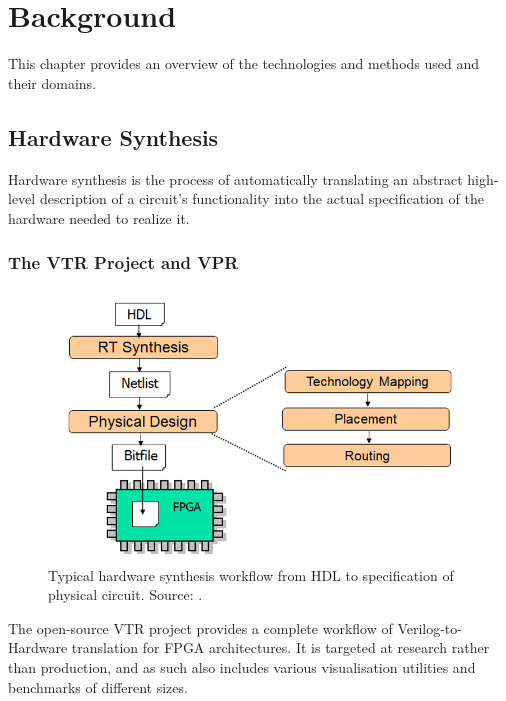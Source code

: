 
\chapter{Background}\label{ch:relatedwork}
\glsresetall %

This chapter provides an overview of the technologies and methods used and their domains.

\section{Hardware Synthesis}

Hardware synthesis is the process of automatically translating an abstract high-level description of a circuit's functionality into the actual specification of the hardware needed to realize it.

\subsection{The VTR Project and VPR}

\begin{figure}
	\includegraphics[width=\linewidth]{plots/hardware-synthesis.png}
	\caption{Typical hardware synthesis workflow from \gls{HDL} to specification of physical circuit. Source: \cite{hardware-synthesis-plot}.}
	\label{fig:hardware-synthesis}
\end{figure}

The open-source \gls{VTR} project\cite{vtr8} provides a complete workflow of Verilog-to-Hardware translation for \gls{FPGA} architectures. It is targeted at research rather than production, and as such also includes various visualisation utilities and benchmarks of different sizes.

